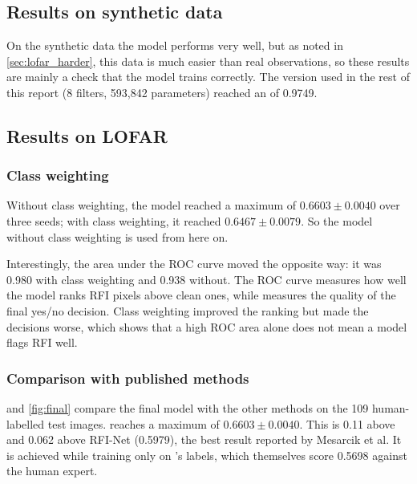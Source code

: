 \chapter{\hybrid}
\label{ch:hybrid}

\section{Results on synthetic data}
On the synthetic data the model performs very well, but as
noted in \cref{sec:lofar_harder}, this data is much easier than real observations, so
these results are mainly a check that the model trains correctly.
The version used in the rest of this report (8 filters, 593{,}842 parameters)
reached an \Fone{} of 0.9749.

\section{Results on LOFAR}
\label{sec:hybrid_lofar}

\subsection{Class weighting}
Without class weighting, the model reached a maximum \Fone{} of
$0.6603 \pm 0.0040$ over three seeds; with class weighting, it reached
$0.6467 \pm 0.0079$. So the model without class weighting is used from here on.

Interestingly, the area under the ROC curve moved the opposite way: it was
0.980 with class weighting and 0.938 without. The ROC curve measures how well the model ranks RFI pixels
above clean ones, while \Fone{} measures the quality of the final yes/no
decision. Class weighting improved the ranking but made the decisions worse,
which shows that a high ROC area alone does not mean a model flags RFI well.

\subsection{Comparison with published methods}
 and \cref{fig:final} compare the final model with the other
methods on the 109 human-labelled test images. \hybrid{} reaches a maximum
\Fone{} of $0.6603 \pm 0.0040$. This is 0.11 above \tfunet{} and 0.062 above
RFI-Net (0.5979), the best result reported by Mesarcik et al. It is
achieved while training only on \aoflagger{}'s labels, which themselves score
0.5698 against the human expert.

